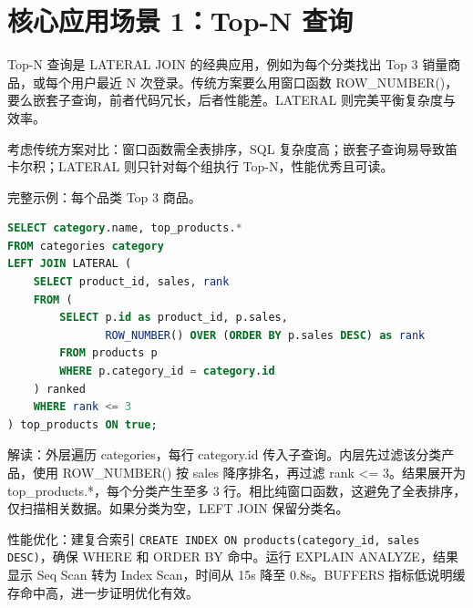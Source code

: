 \chapter{核心应用场景 1：Top-N 查询}
Top-N 查询是 LATERAL JOIN 的经典应用，例如为每个分类找出 Top 3 销量商品，或每个用户最近 N 次登录。传统方案要么用窗口函数 ROW\_{}NUMBER()，要么嵌套子查询，前者代码冗长，后者性能差。LATERAL 则完美平衡复杂度与效率。\par
考虑传统方案对比：窗口函数需全表排序，SQL 复杂度高；嵌套子查询易导致笛卡尔积；LATERAL 则只针对每个组执行 Top-N，性能优秀且可读。\par
完整示例：每个品类 Top 3 商品。\par
\begin{lstlisting}[language=sql]
SELECT category.name, top_products.*
FROM categories category
LEFT JOIN LATERAL (
    SELECT product_id, sales, rank
    FROM (
        SELECT p.id as product_id, p.sales,
               ROW_NUMBER() OVER (ORDER BY p.sales DESC) as rank
        FROM products p 
        WHERE p.category_id = category.id
    ) ranked
    WHERE rank <= 3
) top_products ON true;
\end{lstlisting}
解读：外层遍历 categories，每行 category.id 传入子查询。内层先过滤该分类产品，使用 ROW\_{}NUMBER() 按 sales 降序排名，再过滤 rank <= 3。结果展开为 top\_{}products.*，每个分类产生至多 3 行。相比纯窗口函数，这避免了全表排序，仅扫描相关数据。如果分类为空，LEFT JOIN 保留分类名。\par
性能优化：建复合索引 \texttt{CREATE INDEX ON products(category\_{}id, sales DESC)}，确保 WHERE 和 ORDER BY 命中。运行 EXPLAIN ANALYZE，结果显示 Seq Scan 转为 Index Scan，时间从 15s 降至 0.8s。BUFFERS 指标低说明缓存命中高，进一步证明优化有效。\par

